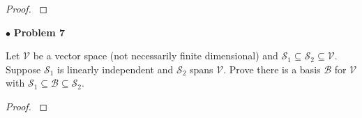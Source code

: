 \documentclass{article}
\begin{document}
\begin{proof}
$ $\newline
\end{proof}

\newpage
$ \bullet$ \textbf{Problem 7}
\medskip

\begin{itshape}
Let $\mathcal{V}$ be a vector space (not necessarily finite dimensional) and $\mathcal{S}_1 \subseteq \mathcal{S}_2 \subseteq \mathcal{V}$. Suppose $\mathcal{S}_1$ is linearly independent and $\mathcal{S}_2$ spans $\mathcal{V}$. Prove there is a basis $\mathcal{B}$ for $\mathcal{V}$ with $\mathcal{S}_1 \subseteq \mathcal{B} \subseteq \mathcal{S}_2$.
\end{itshape}
\medskip

\begin{proof}
$ $\newline
\end{proof}
\end{document}
